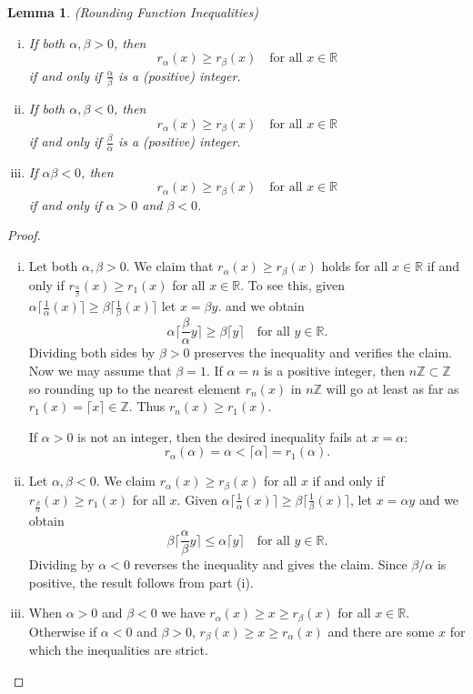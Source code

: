 \documentclass[12pt,letterpaper, reqno]{amsart}
\newtheorem{lem}[thm]{Lemma}
\theoremstyle{definition}
\theoremstyle{remark}
\newcommand{\RR}{\ensuremath{\mathbb{R}}}
\newcommand{\ZZ}{\ensuremath{\mathbb{Z}}}
\newcommand{\floor}[1]{\lfloor{#1}\rfloor}
\newcommand{\ceil}[1]{\lceil{#1}\rceil}
\newcommand{\bceil}[1]{\bigg\lceil{#1}\bigg\rceil}
\begin{document}
\begin{lem} \label{rounding} {\em (Rounding Function Inequalities)}

\begin{enumerate}[(i)]
\item[(i)]  If both $\alpha,\beta>0$, then
\[ r_\alpha(x) \geq r_\beta(x) \quad\text{for all }x\in\RR\]
if and only if $\frac{\alpha}{\beta}$ is a (positive) integer.
\item[(ii)]  If both $\alpha,\beta<0$, then
\[ r_\alpha(x) \geq r_\beta(x) \quad\text{for all }x\in\RR\]
if and only if $\frac{\beta}{\alpha}$ is a (positive) integer.
\item[(iii)] If $\alpha\beta<0$, then
\[ r_\alpha(x) \geq r_\beta(x) \quad\text{for all }x\in\RR\]
if and only if $\alpha>0$ and $\beta<0$.
\end{enumerate}
\end{lem}
\begin{proof}
\begin{enumerate}[(i)]
\item  Let both $\alpha, \beta >0$. We claim that $r_{\alpha}(x) \ge r_{\beta}(x)$ holds for all $x \in \RR$
 if and only if $r_{\frac{\alpha}{\beta}}(x) \ge r_1(x)$ for all $x \in \RR$. To see this, given 
 $\alpha \lceil \frac{1}{\alpha}(x) \rceil \ge \beta \lceil \frac{1}{\beta}(x) \rceil$ let $x = \beta y$.
 and we obtain
 $$
 \alpha \bceil{ \frac{\beta}{\alpha} y } \ge \beta \ceil{ y }
 \quad\text{for all }y\in\RR .
 $$
Dividing both sides by $\beta >0$ preserves the inequality and verifies the claim.
Now we may  assume  that $\beta=1$.
If $\alpha = n$ is a positive integer, then $n\ZZ\subset\ZZ$ so rounding up to the nearest element $r_n(x)$ in $n\ZZ$ will go at least as far as $r_1(x) = \ceil x\in\ZZ$. Thus $r_n(x)\geq r_1(x)$.

If $\alpha>0$ is not an integer, then the desired inequality fails at $x=\alpha$:
\[ r_\alpha(\alpha) = \alpha < \ceil{\alpha} = r_1(\alpha).\]
\item[(ii)]
Let $\alpha, \beta <0$. We claim $r_{\alpha}(x) \ge r_{\beta}(x)$
for all $x$ if and only if $r_{\frac{\beta}{\alpha}}(x) \ge r_1(x)$ for all $x$.
Given 
 $\alpha \lceil \frac{1}{\alpha}(x) \rceil \ge \beta \lceil \frac{1}{\beta}(x) \rceil$, 
let $x = \alpha y$ and we obtain
$$
 \beta \bceil{ \frac{\alpha}{\beta} y } \le \alpha \ceil y  \quad\text{for all }y\in\RR .
$$
Dividing by $\alpha <0$ reverses the inequality and  gives the claim. Since $\beta/\alpha$ is positive, the result follows from part (i).

\item[(iii)] 
When $\alpha >0$ and $\beta <0$ we have $r_\alpha(x)\geq x\geq r_\beta(x)$ for all $x \in \RR$.
Otherwise if $\alpha<0$ and $\beta > 0$, $r_\beta(x)\geq x\geq r_\alpha(x)$ and there are some $x$ for which the inequalities are strict.
\end{enumerate}
\end{proof}
\end{document}
